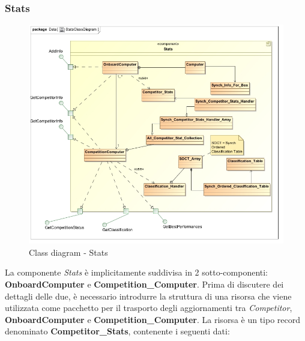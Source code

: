 \subsubsection{Stats}
\begin{center}
\begin{figure}[h!]
	\includegraphics[scale=0.50]{img/ClassDiagrams/StatsClassDiagram.jpg}
\caption{Class diagram - Stats}
\end{figure}
\end{center}
La componente \emph{Stats} \`{e} implicitamente suddivisa in 2 sotto-componenti: \textbf{OnboardComputer} e \textbf{Competition\_Computer}. 
Prima di discutere dei dettagli delle due, \`{e} necessario introdurre la struttura di una risorsa che viene utilizzata come
pacchetto per il trasporto degli aggiornamenti tra \emph{Competitor}, \textbf{OnboardComputer} e \textbf{Competition\_Computer}. La risorsa \`{e} 
un tipo record denominato \textbf{Competitor\_Stats}, contenente i seguenti dati:
